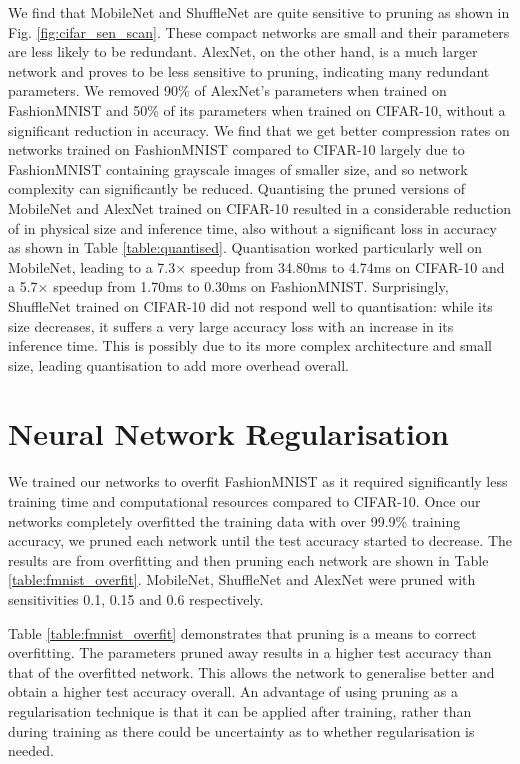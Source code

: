 \documentclass[conference]{IEEEtran}
\begin{document}
We find that MobileNet and ShuffleNet are quite sensitive to pruning as shown in Fig. \ref{fig:cifar_sen_scan}. These compact networks are small and their parameters are less likely to be redundant. AlexNet, on the other hand, is a much larger network and proves to be less sensitive to pruning, indicating many redundant parameters. We removed 90\% of AlexNet's parameters when trained on FashionMNIST and 50\% of its parameters when trained on CIFAR-10, without a significant reduction in accuracy. We find that we get better compression rates on networks trained on FashionMNIST compared to CIFAR-10 largely due to FashionMNIST containing grayscale images of smaller size, and so network complexity can significantly be reduced.
Quantising the pruned versions of MobileNet and AlexNet trained on CIFAR-10 resulted in a considerable reduction of in physical size and inference time, also without a significant loss in accuracy as shown in Table \ref{table:quantised}. Quantisation worked particularly well on MobileNet, leading to a 7.3$\times$ speedup from 34.80ms to 4.74ms on CIFAR-10 and a 5.7$\times$ speedup from 1.70ms to 0.30ms on FashionMNIST. Surprisingly, ShuffleNet trained on CIFAR-10 did not respond well to quantisation: while its size decreases, it suffers a very large accuracy loss with an increase in its inference time. This is possibly due to its more complex architecture and small size, leading quantisation to add more overhead overall.





\section{Neural Network Regularisation}
We trained our networks to overfit FashionMNIST as it required significantly less training time and computational resources compared to CIFAR-10. Once our networks completely overfitted the training data with over 99.9\% training accuracy, we pruned each network until the test accuracy started to decrease. The results are from overfitting and then pruning each network are shown in Table \ref{table:fmnist_overfit}. MobileNet, ShuffleNet and AlexNet were pruned with sensitivities 0.1, 0.15 and 0.6 respectively.

Table \ref{table:fmnist_overfit} demonstrates that pruning is a means to correct overfitting. The parameters pruned away results in a higher test accuracy than that of the overfitted network. This allows the network to generalise better and obtain a higher test accuracy overall. An advantage of using pruning as a regularisation technique is that it can be applied after training, rather than during training as there could be uncertainty as to whether regularisation is needed.
\end{document}
